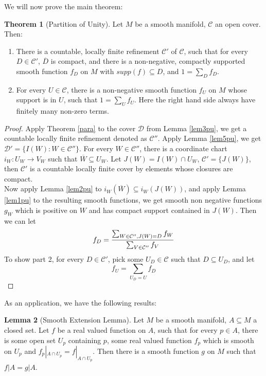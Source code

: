 \documentclass{article}
\theoremstyle{definition}
\newtheorem{thm}{Theorem}[section]
\newtheorem{lem}[thm]{Lemma}
\begin{document}
We will now prove the main theorem:

\begin{thm}[Partition of Unity]\label{pu}
Let $M$ be a smooth manifold, $\mathcal{C}$ an open cover. Then:
\begin{enumerate}
    \item There is a countable, locally finite refinement $\mathcal{C}'$ of $\mathcal{C}$, such that for every $D\in \mathcal{C}'$, $\overline{D}$ is compact, and there is a non-negative, compactly supported smooth function $f_D$ on $M$ with $supp(f)\subseteq D$, and $1=\sum_D f_D$.
    \item For every $U\in\mathcal{C}$, there is a non-negative smooth function $f_U$ on $M$ whose support is in $U$, such that $1=\sum_U f_U$. Here the right hand side always have finitely many non-zero terms.
\end{enumerate}
\end{thm}

\begin{proof}
    Apply Theorem \ref{para} to the cover $\mathcal{D}$ from Lemma \ref{lem3pu}, we get a countable locally finite refinement denoted as $\mathcal{C}''$. Apply Lemma \ref{lem5pu}, we get $\mathcal{D}'=\{I(W): W\in\mathcal{C}''\}$. For every $W\in\mathcal{C}''$, there is a coordinate chart $i_W: U_W\rightarrow V_W$ such that $\overline{W}\subseteq U_W$. Let $J(W)=I(W)\cap U_W$, $\mathcal{C}'=\{J(W)\}$, then $\mathcal{C}'$ is a countable locally finite cover by elements whose closures are compact.\\

    Now apply Lemma \ref{lem2pu} to $i_W(\overline{W})\subseteq i_W(J(W))$, and apply Lemma \ref{lem1pu} to the resulting smooth functions, we get smooth non negative functions $g_W$ which is positive on $W$ and has compact support contained in $J(W)$. Then we can let 
    \[f_D={\sum_{W\in\mathcal{C}'', J(W)=D}f_W\over\sum_{V\in\mathcal{C}''}f_V}\]
    To show part 2, for every $D\in\mathcal{C}'$, pick some $U_D\in \mathcal{C}$ such that $D\subseteq U_D$, and let \[f_U=\sum_{U_D=U}f_D\]
\end{proof}

As an application, we have the following results:

\begin{lem}[Smooth Extension Lemma]\label{extend}
Let $M$ be a smooth manifold, $A\subseteq M$ a closed set. Let $f$ be a real valued function on $A$, such that for every $p\in A$, there is some open set $U_p$ containing $p$, some real valued function $f_p$ which is smooth on $U_p$ and $f_p|_{A\cap U_p}=f|_{A\cap U_p}$. Then there is a smooth function $g$ on $M$ such that $f|A=g|A$. 
\end{lem}
\end{document}
